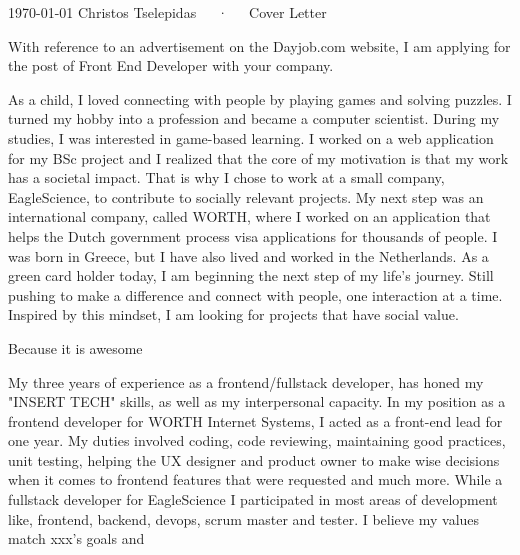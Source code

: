 \documentclass[11pt, a4paper]{awesome-cv}
\begin{document}
\makecvheader[R]

\makecvfooter
  {\today}
  {Christos Tselepidas~~~·~~~Cover Letter}
  {}

\makelettertitle

\begin{cvletter}

With reference to an advertisement on the Dayjob.com website, I am applying for the post of Front End Developer with your company.

As a child, I loved connecting with people by playing games and solving puzzles. I turned my hobby into a profession and became a computer scientist. During my studies, I was interested in game-based learning. I worked on a web application for my BSc project and I realized that the core of my motivation is that my work has a societal impact. That is why I chose to work at a small company, EagleScience, to contribute to socially relevant projects. My next step was an international company, called WORTH, where I worked on an application that helps the Dutch government process visa applications for thousands of people. I was born in Greece, but I have also lived and worked in the Netherlands. As a green card holder today, I am beginning the next step of my life's journey. Still pushing to make a difference and connect with people, one interaction at a time. Inspired by this mindset, I am looking for projects that have social value. 

Because it is awesome

My three years of experience as a frontend/fullstack developer, has honed my "INSERT TECH" skills, as well as my interpersonal capacity.
In my position as a frontend developer for WORTH Internet Systems, I acted as a front-end lead for one year. My duties involved coding, code reviewing, maintaining good practices, unit testing, helping the UX designer and product owner to make wise decisions when it comes to frontend features that were requested and much more.
While a fullstack developer for EagleScience I participated in most areas of development like, frontend, backend, devops, scrum master and tester.
I believe my values match xxx's goals and

\end{cvletter}


\makeletterclosing
\end{document}
